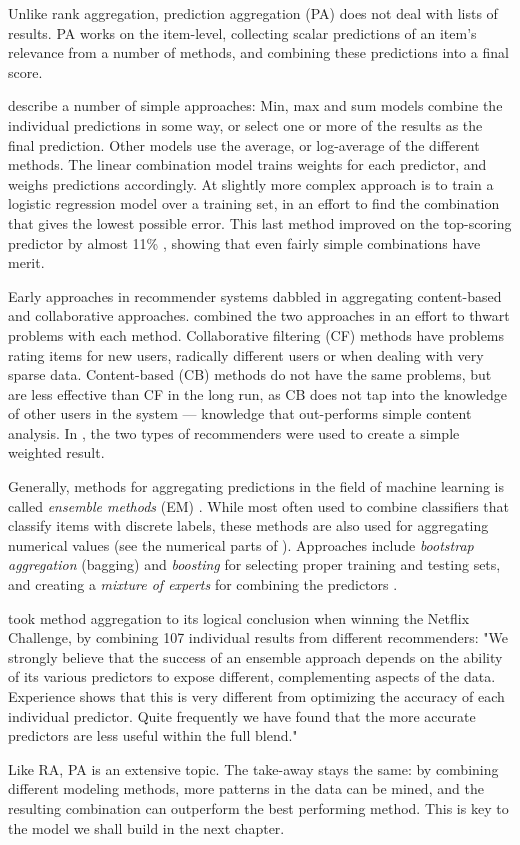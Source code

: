 Unlike rank aggregation, prediction aggregation (PA) does not deal with lists of results.
PA works on the item-level, collecting scalar predictions of an item's relevance from a number of methods,
and combining these predictions into a final score.

\cite{Aslam2001} describe a number of simple approaches:
Min, max and sum models combine the individual predictions in some way, 
or select one or more of the results as the final prediction. 
Other models use the average, or log-average of the different methods.
The linear combination model trains weights for each predictor, and weighs predictions accordingly.
At slightly more complex approach is to train a logistic regression model \cite[p3]{Aslam2001}
over a training set, in an effort to find the combination that gives the lowest possible error.
This last method improved on the top-scoring predictor by almost 11\% \cite[p3]{Aslam2001},
showing that even fairly simple combinations have merit.

Early approaches in recommender systems dabbled in aggregating content-based and collaborative approaches.
\cite{Claypool1999} combined the two approaches in an effort to thwart problems with each method.
Collaborative filtering (CF) methods have problems rating items for new users, radically different users or when dealing with very sparse data.
Content-based (CB) methods do not have the same problems, but are less effective than CF in the long run, as CB does not tap into the 
knowledge of other users in the system --- knowledge that out-performs simple content analysis.
In \cite{Claypool1999}, the two types of recommenders were used to create a simple weighted result.

Generally, methods for aggregating predictions in the field of machine learning is called \emph{ensemble methods} (EM) \cite[p1]{Dietterich2000}.
While most often used to combine classifiers that classify items with discrete labels,
these methods are also used for aggregating numerical values (see the numerical parts of \cite{Breiman1996}).
Approaches include \emph{bootstrap aggregation} (bagging) and \emph{boosting} 
for selecting proper training and testing sets,
and creating a \emph{mixture of experts} for combining the predictors
\cite[p27]{Polikar2006}.


\cite{Bell2007} took method aggregation to its logical conclusion when winning the Netflix Challenge,
by combining 107 individual results from different recommenders: 
"We strongly believe that the success of an ensemble approach depends on the ability of its various predictors to expose different, 
complementing aspects of the data. Experience shows that this is very different from optimizing the accuracy of each individual predictor. 
Quite frequently we have found that the more accurate predictors are less useful within the full blend." \cite[p6]{Bell2007}

Like RA, PA is an extensive topic.
The take-away stays the same: by combining different modeling methods,
more patterns in the data can be mined, and 
the resulting combination can outperform the best performing method.
This is key to the model we shall build in the next chapter.


